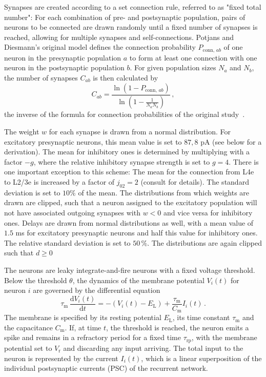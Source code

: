 Synapses are created according to a set connection rule, referred to as 
"fixed total number":
For each combination of pre- and postsynaptic population, pairs of neurons to be connected are drawn
randomly until a fixed number of synapses is reached, 
allowing for multiple synapses and self-connections. 
Potjans and Diesmann's original model defines the connection probability $P_{\text{conn}, \,ab}$ 
of one neuron in the presynaptic population $a$ to form at least one connection with one neuron in 
the postsynaptic population $b$. For given population sizes $N_a$ and $N_b$, the number of 
synapses $C_{ab}$ is then calculated by
\begin{equation}
    C_{ab} = \frac{\ln \left( 1 - P_{\text{conn}, \,ab} \right)}{\ln \left( 1 - \frac{1}{N_a N_b} \right)} \, ,
    \label{eq:synapse_numbers}
\end{equation}
the inverse of the formula for connection probabilities of the original study~\cite{potjans2014}.

The weight $w$ for each synapse is drawn from a normal distribution.
For excitatory presynaptic neurons, this mean value is set to $87,8$ pA (see below for 
a derivation). The mean for inhibitory ones is determined by multiplying 
with a factor $-g$, where the relative inhibitory synapse strength is set to 
$g = 4$. There is one important exception to this scheme:
The mean for the connection from L4e to L2/3e is increased by a factor of 
$j_{02} = 2$ (consult \cite{potjans2014} for details). 
The standard deviation is set to $10\%$ of the mean. 
The distributions from which weights are drawn are clipped, 
such that a neuron assigned to the excitatory 
population will not have associated outgoing synapses with $w < 0$ 
and vice versa for inhibitory ones. 
Delays are drawn from normal distributions as well, with a mean value 
of $1.5$ ms for excitatory presynaptic neurons and half this value for 
inhibitory ones. The relative standard deviation is set to $50\,\%$. The distributions
are again clipped such that $d \ge 0$

The neurons are leaky integrate-and-fire neurons with a fixed voltage threshold. 
Below the threshold $\theta$, the dynamics of the membrane potential $V_i(t)$ 
for neuron $i$ are governed by the differential equation 
\begin{equation}
    \tau_\text{m} \,\frac{\text{d} V_i(t)}{\text{d} t} 
            = -(V_i(t) - E_\text{L}) + \frac{\tau_\text{m}}{C_\text{m}} I_i(t) \, .
    \label{eq:leaky_integrator}
\end{equation}
The membrane is specified by its resting potential $E_\text{L}$, 
its time constant $\tau_\text{m}$ and the capacitance $C_\text{m}$.
If, at time $t$, the threshold is reached, the neuron emits a spike and remains 
in a refractory period for a fixed time $\tau_\text{rp}$, with the membrane 
potential set to $V_\text{r}$ and discarding any input arriving. 
The total input to the neuron is represented by 
the current $I_i(t)$, which is a linear superposition of the individual 
postsynaptic currents (PSC) of the recurrent network.

